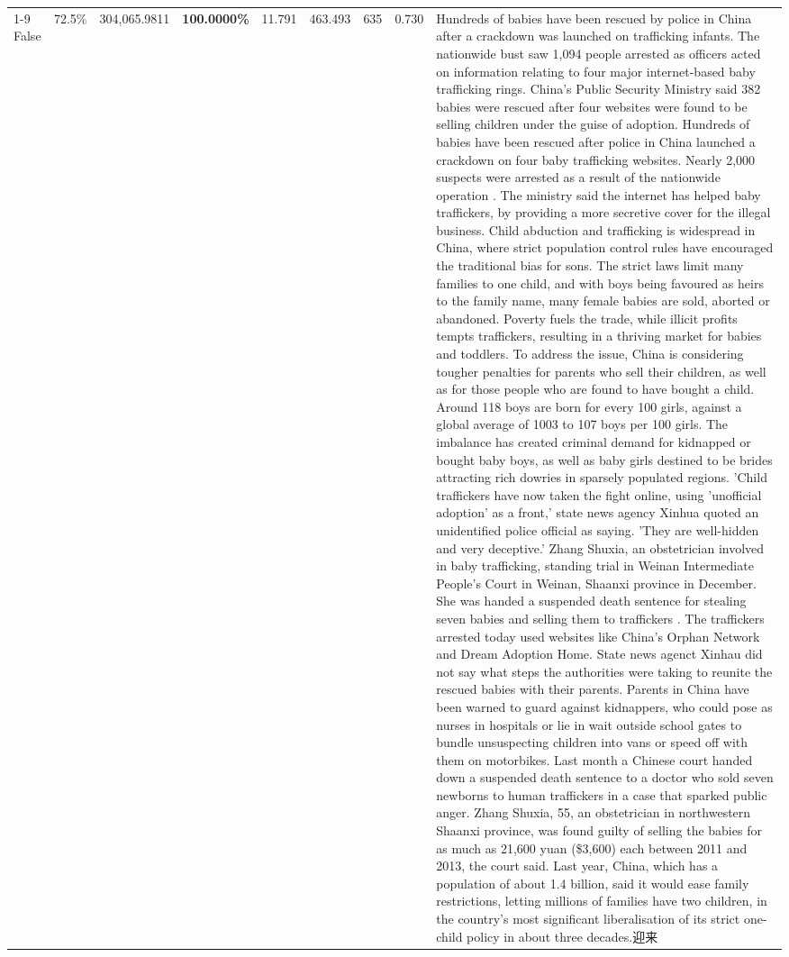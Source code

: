 \begin{table}[H]
\begin{tabular}{lllrlllll}
\cline{1-9}
False & 72.5\% & 304,065.9811 & \bfseries \color{red} 100.0000\% & 11.791 & 463.493 & 635 & 0.730 & Hundreds of babies have been rescued by police in China after a crackdown was launched on trafficking infants. The nationwide bust saw 1,094 people arrested as officers acted on information relating to four major internet-based baby trafficking rings. China's Public Security Ministry said 382 babies were rescued after four websites were found to be selling children under the guise of adoption. Hundreds of babies have been rescued after police in China launched a crackdown on four baby trafficking websites. Nearly 2,000 suspects were arrested as a result of the nationwide operation . The ministry said the internet has helped baby traffickers, by providing a more secretive cover for the illegal business. Child abduction and trafficking is widespread in China, where strict population control rules have encouraged the traditional bias for sons. The strict laws limit many families to one child, and with boys being favoured as heirs to the family name, many female babies are sold, aborted or abandoned. Poverty fuels the trade, while illicit profits tempts traffickers, resulting in a thriving market for babies and toddlers. To address the issue, China is considering tougher penalties for parents who sell their children, as well as for those people who are found to have bought a child. Around 118 boys are born for every 100 girls, against a global average of 1003 to 107 boys per 100 girls. The imbalance has created criminal demand for kidnapped or bought baby boys, as well as baby girls destined to be brides attracting rich dowries in sparsely populated regions. 'Child traffickers have now taken the fight online, using 'unofficial adoption' as a front,' state news agency Xinhua quoted an unidentified police official as saying. 'They are well-hidden and very deceptive.' Zhang Shuxia, an obstetrician involved in baby trafficking, standing trial in Weinan Intermediate People's Court in Weinan, Shaanxi province in December. She was handed a suspended death sentence for stealing seven babies and selling them to traffickers . The traffickers arrested today used websites like China's Orphan Network and Dream Adoption Home. State news agenct Xinhau did not say what steps the authorities were taking to reunite the rescued babies with their parents. Parents in China have been warned to guard against kidnappers, who could pose as nurses in hospitals or lie in wait outside school gates to bundle unsuspecting children into vans or speed off with them on motorbikes. Last month a Chinese court handed down a suspended death sentence to a doctor who sold seven newborns to human traffickers in a case that sparked public anger. Zhang Shuxia, 55, an obstetrician in northwestern Shaanxi province, was found guilty of selling the babies for as much as 21,600 yuan (\$3,600) each between 2011 and 2013, the court said. Last year, China, which has a population of about 1.4 billion, said it would ease family restrictions, letting millions of families have two children, in the country's most significant liberalisation of its strict one-child policy in about three decades.迎来 \\

\end{tabular}
\end{table}

